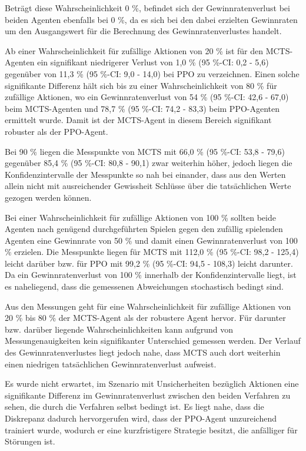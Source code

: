 Beträgt diese Wahrscheinlichkeit 0 \%, befindet sich der Gewinnratenverlust bei beiden Agenten ebenfalls bei 0 \%, da es sich bei den dabei erzielten Gewinnraten um den Ausgangswert für die Berechnung des Gewinnratenverlustes handelt.

Ab einer Wahrscheinlichkeit für zufällige Aktionen von 20 \% ist für den MCTS-Agenten ein signifikant niedrigerer Verlust von 1,0 \% (95 \%-CI: 0,2 - 5,6) gegenüber von 11,3 \% (95 \%-CI: 9,0 - 14,0) bei PPO zu verzeichnen. Einen solche signifikante Differenz hält sich bis zu einer Wahrscheinlichkeit von 80 \% für zufällige Aktionen, wo ein Gewinnratenverlust von 54 \% (95 \%-CI: 42,6 - 67,0) beim MCTS-Agenten und 78,7 \% (95 \%-CI: 74,2 - 83,3) beim PPO-Agenten ermittelt wurde. Damit ist der MCTS-Agent in diesem Bereich signifikant robuster als der PPO-Agent.

Bei 90 \% liegen die Messpunkte von MCTS mit 66,0 \% (95 \%-CI: 53,8 - 79,6) gegenüber 85,4 \% (95 \%-CI: 80,8 - 90,1) zwar weiterhin höher, jedoch liegen die Konfidenzintervalle der Messpunkte so nah bei einander, dass aus den Werten allein nicht mit ausreichender Gewissheit Schlüsse über die tatsächlichen Werte gezogen werden können.

Bei einer Wahrscheinlichkeit für zufällige Aktionen von 100 \% sollten beide Agenten nach genügend durchgeführten Spielen gegen den zufällig spielenden Agenten eine Gewinnrate von 50 \% und damit einen Gewinnratenverlust von 100 \% erzielen. Die Messpunkte liegen für MCTS mit 112,0 \% (95 \%-CI: 98,2 - 125,4) leicht darüber bzw. für PPO mit 99,2 \% (95 \%-CI: 94,5 - 108,3) leicht darunter. Da ein Gewinnratenverlust von 100 \% innerhalb der Konfidenzintervalle liegt, ist es naheliegend, dass die gemessenen Abweichungen stochastisch bedingt sind.

Aus den Messungen geht für eine Wahrscheinlichkeit für zufällige Aktionen von 20 \% bis 80 \% der MCTS-Agent als der robustere Agent hervor. Für darunter bzw. darüber liegende Wahrscheinlichkeiten kann aufgrund von Messungenauigkeiten kein signifikanter Unterschied gemessen werden. Der Verlauf des Gewinnratenverlustes liegt jedoch nahe, dass MCTS auch dort weiterhin einen niedrigen tatsächlichen Gewinnratenverlust aufweist.

Es wurde nicht erwartet, im Szenario mit Unsicherheiten bezüglich Aktionen eine signifikante Differenz im Gewinnratenverlust zwischen den beiden Verfahren zu sehen, die durch die Verfahren selbst bedingt ist. Es liegt nahe, dass die Diskrepanz dadurch hervorgerufen wird, dass der PPO-Agent unzureichend trainiert wurde, wodurch er eine kurzfristigere Strategie besitzt, die anfälliger für Störungen ist.

